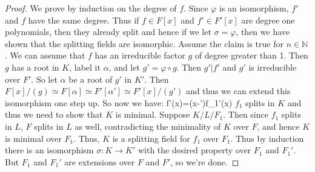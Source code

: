 \documentclass{article}                                                        %
\begin{document}
            \begin{proof}
                We prove by induction on the degree of $f$. Since $\varphi$ is
                an isomorphism, $f'$ and $f$ have the same degree. Thus if
                $f\in{F}[x]$ and $f'\in{F}'[x]$ are degree one polynomials, then
                they already split and hence if we let $\sigma=\varphi$, then
                we have shown that the splitting fields are isomorphic. Assume
                the claim is true for $n\in\mathbb{N}$. We can assume that $f$
                has an irreducible factor $g$ of degree greater than 1. Then
                $g$ has a root in $K$, label it $\alpha$, and let
                $g'=\varphi\circ{g}$. Then $g'|f'$ and $g'$ is irreducible
                over $F'$. So let $\alpha$ be a root of $g'$ in $K'$. Then
                $F[x]/(g)\simeq{F}[\alpha]\simeq{F}'[\alpha']\simeq{F}'[x]/(g')$
                and thus we can extend this isomorphism one step up. So now we
                have:
                            {f'(x)=(x-\alpha')f_{1}'(x)}
                $f_{1}$ splits in $K$ and thus we need to show that $K$ is
                minimal. Suppose $K/L/F_{1}$. Then since $f_{1}$ splits in $L$,
                $F$ splits in $L$ as well, contradicting the minimality of $K$
                over $F$, and hence $K$ is minimal over $F_{1}$. Thus, $K$ is
                a splitting field for $f_{1}$ over $F_{1}$. Thus by induction
                there is an isomorphism $\sigma:K\rightarrow{K}'$ with the
                desired property over $F_{1}$ and $F_{1}'$. But $F_{1}$ and
                $F_{1}'$ are extensions over $F$ and $F'$, so we're done.
            \end{proof}
\end{document}
